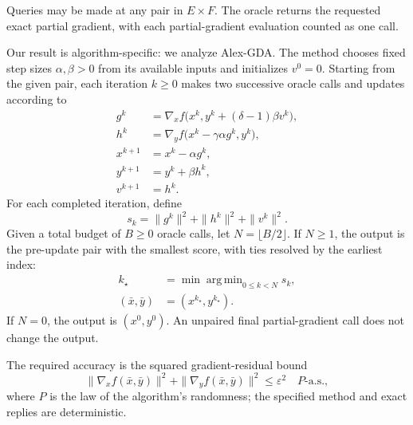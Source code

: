 \documentclass[10pt]{article}
\theoremstyle{definition}
\begin{document}
Queries may be made at any pair in $E\times F$. The oracle returns the requested exact partial gradient, with each partial-gradient evaluation counted as one call.

Our result is algorithm-specific: we analyze Alex-GDA. The method chooses fixed step sizes $\alpha,\beta>0$ from its available inputs and initializes $v^0=0$. Starting from the given pair, each iteration $k\geq0$ makes two successive oracle calls and updates according to
\[
\begin{aligned}
g^k&=\nabla_x f\bigl(x^k,y^k+(\delta-1)\beta v^k\bigr),\\
h^k&=\nabla_y f\bigl(x^k-\gamma\alpha g^k,y^k\bigr),\\
x^{k+1}&=x^k-\alpha g^k,\\
y^{k+1}&=y^k+\beta h^k,\\
v^{k+1}&=h^k.
\end{aligned}
\]
For each completed iteration, define
\[
s_k=\|g^k\|^2+\|h^k\|^2+\|v^k\|^2.
\]
Given a total budget of $B\geq0$ oracle calls, let $N=\lfloor B/2\rfloor$. If $N\geq1$, the output is the pre-update pair with the smallest score, with ties resolved by the earliest index:
\[
\begin{aligned}
k_\star&=\min\mathop{\mathrm{arg\,min}}_{0\leq k<N}s_k,\\
(\bar{x},\bar{y})&=(x^{k_\star},y^{k_\star}).
\end{aligned}
\]
If $N=0$, the output is $(x^0,y^0)$. An unpaired final partial-gradient call does not change the output.

The required accuracy is the squared gradient-residual bound
\[
\|\nabla_x f(\bar{x},\bar{y})\|^2
+\|\nabla_y f(\bar{x},\bar{y})\|^2
\leq\varepsilon^2
\quad P\text{-a.s.},
\]
where $P$ is the law of the algorithm's randomness; the specified method and exact replies are deterministic.
\end{document}
